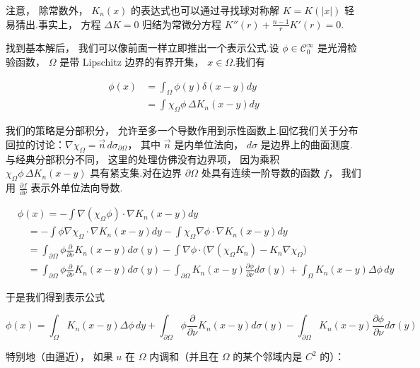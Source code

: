\begin{remark*}
注意， 除常数外， $K_{n}(x)$ 的表达式也可以通过寻找球对称解 $K = K(|x|)$ 轻易猜出.事实上， 方程 $\Delta K = 0$ 归结为常微分方程 $K''(r) + \frac{n-1}{r}K'(r) = 0$.
\end{remark*}

找到基本解后， 我们可以像前面一样立即推出一个表示公式.设 $\phi \in \mathcal{C}_{0}^{\infty}$ 是光滑检验函数， $\Omega$ 是带 Lipschitz 边界的有界开集， $x \in \Omega$.我们有

\[
\begin{aligned}
\phi(x) &= \int_{\Omega}\phi(y)\delta(x-y)dy \\
&= \int \chi_{\Omega}\phi\, \Delta K_{n}(x-y)dy
\end{aligned}
\]

我们的策略是分部积分， 允许至多一个导数作用到示性函数上.回忆我们关于分布回拉的讨论：$\nabla\chi_{\Omega} = \vec{n}\, d\sigma_{\partial\Omega}$， 其中 $\vec{n}$ 是内单位法向， $d\sigma$ 是边界上的曲面测度.与经典分部积分不同， 这里的处理仿佛没有边界项， 因为乘积 $\chi_{\Omega}\phi\, \Delta K_{n}(x-y)$ 具有紧支集.对在边界 $\partial\Omega$ 处具有连续一阶导数的函数 $f$， 我们用 $\frac{\partial f}{\partial\nu}$ 表示外单位法向导数.

\[
\begin{aligned}
&\phi(x) = -\int \nabla(\chi_{\Omega}\phi) \cdot \nabla K_{n}(x-y)dy \\
&\quad = -\int \phi\nabla\chi_{\Omega} \cdot \nabla K_{n}(x-y)dy - \int \chi_{\Omega}\nabla\phi \cdot \nabla K_{n}(x-y)dy \\
&\quad = \int_{\partial\Omega}\phi\frac{\partial}{\partial\nu}K_{n}(x-y)d\sigma(y) - \int \nabla\phi \cdot \bigl(\nabla(\chi_{\Omega}K_{n}) - K_{n}\nabla\chi_{\Omega}\bigr) \\
&\quad = \int_{\partial\Omega}\phi\frac{\partial}{\partial\nu}K_{n}(x-y)d\sigma(y) - \int_{\partial\Omega}K_{n}(x-y)\frac{\partial\phi}{\partial\nu}d\sigma(y) + \int_{\Omega}K_{n}(x-y)\Delta\phi\, dy
\end{aligned}
\]

于是我们得到表示公式

\begin{equation}
\phi(x) = \int_{\Omega}K_{n}(x-y)\Delta\phi\, dy + \int_{\partial\Omega}\phi\frac{\partial}{\partial\nu}K_{n}(x-y)d\sigma(y) - \int_{\partial\Omega}K_{n}(x-y)\frac{\partial\phi}{\partial\nu}d\sigma(y)\label{eq:c4-137}
\end{equation}

特别地（由逼近）， 如果 $u$ 在 $\Omega$ 内调和（并且在 $\Omega$ 的某个邻域内是 $C^{2}$ 的）：

